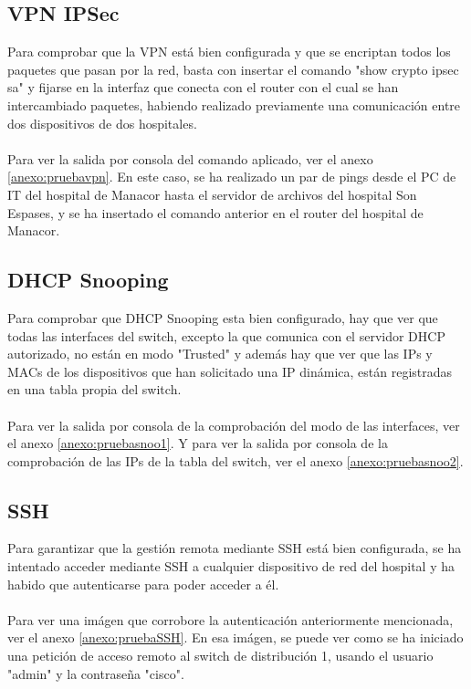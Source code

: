 \subsection{VPN IPSec}
Para comprobar que la VPN está bien configurada y que se encriptan todos los paquetes que pasan por la red, basta con insertar el comando "show crypto ipsec sa" y fijarse en la interfaz que 
conecta con el router con el cual se han intercambiado paquetes, habiendo realizado previamente una comunicación entre dos dispositivos de dos hospitales.
\\ \\
Para ver la salida por consola del comando aplicado, ver el anexo \ref{anexo:pruebavpn}. En este caso, se ha realizado un par de pings desde el PC de IT del hospital de Manacor hasta el 
servidor de archivos del hospital Son Espases, y se ha insertado el comando anterior en el router del hospital de Manacor.

\subsection{DHCP Snooping}
Para comprobar que DHCP Snooping esta bien configurado, hay que ver que todas las interfaces del switch, excepto la que comunica con el servidor DHCP autorizado, no están en modo 
"Trusted" y además hay que ver que las IPs y MACs de los dispositivos que han solicitado una IP dinámica, están registradas en una tabla propia del switch.
\\ \\
Para ver la salida por consola de la comprobación del modo de las interfaces, ver el anexo \ref{anexo:pruebasnoo1}. Y para ver la salida por consola de la comprobación de las IPs de la tabla del switch, ver el anexo \ref{anexo:pruebasnoo2}.

\subsection{SSH}
Para garantizar que la gestión remota mediante SSH está bien configurada, se ha intentado acceder mediante SSH a cualquier dispositivo de red del hospital y ha habido que autenticarse para poder acceder a él.
\\ \\
Para ver una imágen que corrobore la autenticación anteriormente mencionada, ver el anexo \ref{anexo:pruebaSSH}. En esa imágen, se puede ver como se ha iniciado una petición de acceso remoto al switch de distribución 1, usando el usuario "admin" y la contraseña "cisco".

